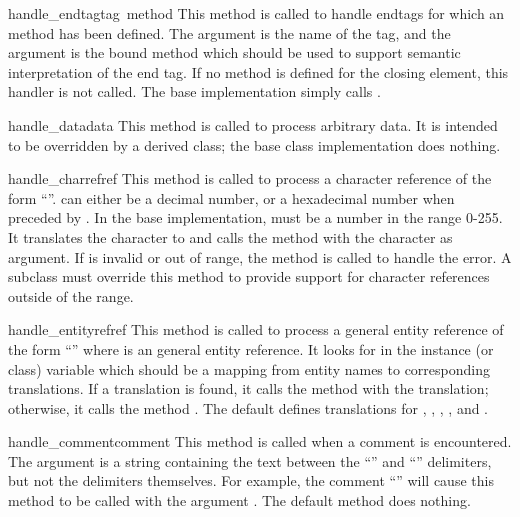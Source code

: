 \begin{funcdesc}{handle_endtag}{tag\, method}
This method is called to handle endtags for which an
 method has been defined.  The 
argument is the name of the tag, and the
 argument is the bound method which should be used to
support semantic interpretation of the end tag.  If no
 method is defined for the closing element, this
handler is not called.  The base implementation simply calls
.
\end{funcdesc}

\begin{funcdesc}{handle_data}{data}
This method is called to process arbitrary data.  It is intended to be
overridden by a derived class; the base class implementation does
nothing.
\end{funcdesc}

\begin{funcdesc}{handle_charref}{ref}
This method is called to process a character reference of the form
``''.   can either be a decimal number,
or a hexadecimal number when preceded by .
In the base implementation,  must be a number in the
range 0-255.  It translates the character to \ASCII{} and calls the
method  with the character as argument.  If
 is invalid or out of range, the method
 is called to handle the error.  A
subclass must override this method to provide support for character
references outside of the \ASCII{} range.
\end{funcdesc}

\begin{funcdesc}{handle_entityref}{ref}
This method is called to process a general entity reference of the form
``'' where  is an general entity
reference.  It looks for  in the instance (or class)
variable  which should be a mapping from entity names
to corresponding translations.
If a translation is found, it calls the method 
with the translation; otherwise, it calls the method
.  The default 
defines translations for , , ,
, and .
\end{funcdesc}

\begin{funcdesc}{handle_comment}{comment}
This method is called when a comment is encountered.  The
 argument is a string containing the text between the
``\code{<!--}'' and ``\code{-->}'' delimiters, but not the delimiters
themselves.  For example, the comment ``'' will
cause this method to be called with the argument .  The
default method does nothing.
\end{funcdesc}

